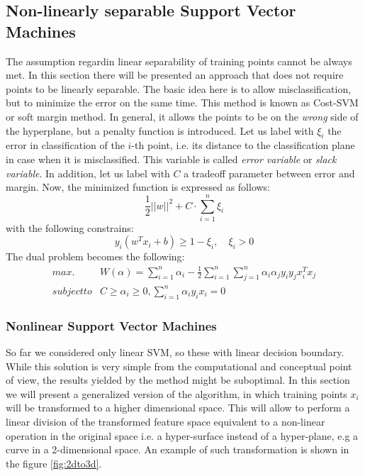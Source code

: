\subsection{Non-linearly separable Support Vector Machines}
The assumption regardin linear separability of training points cannot be always met. In this section there will be presented an approach that does not require points to be linearly separable. The basic idea here is to allow misclassification, but to minimize the error on the same time. This method is known as Cost-SVM or soft margin method. In general, it allows the points to be on the \textit{wrong} side of the hyperplane, but a penalty function is introduced.
Let us label with $\xi_i$ the error in classification of the $i$-th point, i.e. its distance to the classification plane in case when it is misclassified. This variable is called \textit{error variable} or \textit{slack variable}. In addition, let us label with $C$ a tradeoff parameter between error and margin. Now, the minimized function is expressed as follows:
\begin{equation}
\frac{1}{2}||w||^2 + C \cdot \sum_{i=1}^{n}\xi_i
\end{equation}
with the following constrains:
\begin{equation}
y_i \left(w^Tx_i+b\right) \ge 1-\xi_i, \quad \xi_i>0
\end{equation}
The dual problem becomes the following:
\begin{align*}
max. & W(\alpha) = \sum_{i=1}^{n}\alpha_i-\frac{1}{2}\sum_{i=1}^{n}\sum_{j=1}^{n}\alpha_i\alpha_jy_iy_jx^T_ix_j \\
subject to & C \ge \alpha_i \ge 0, \sum_{i=1}^{n}\alpha_iy_ix_i=0
\end{align*}

\subsubsection{Nonlinear Support Vector Machines}
So far we considered only linear SVM, so these with linear decision boundary. While this solution is very simple from the computational and conceptual point of view, the results yielded by the method might be suboptimal. In this section we will present a generalized version of the algorithm, in which training points $x_i$ will be transformed to a higher dimensional space. This will allow to perform a linear division of the transformed feature space equivalent to a non-linear operation in the original space i.e. a hyper-surface instead of a hyper-plane, e.g a curve in a 2-dimensional space. An example of such transformation is shown in the figure \ref{fig:2dto3d}.

